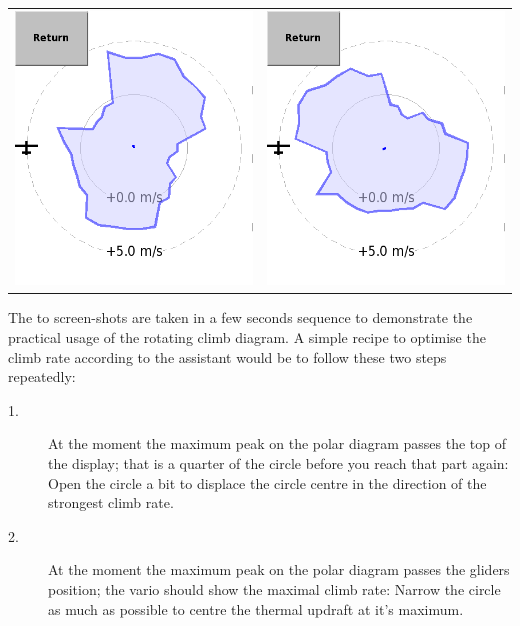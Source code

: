 \begin{tabular}{c c}
\includegraphics[angle=0,width=0.5\linewidth,keepaspectratio='true']{figures/dialog-thermal-assistant0.png}&
\includegraphics[angle=0,width=0.5\linewidth,keepaspectratio='true']{figures/dialog-thermal-assistant1.png}\\
\end{tabular}

The to screen-shots are taken in a few seconds sequence to demonstrate the
practical usage of the rotating climb diagram. A simple recipe to optimise
the climb rate according to the assistant would be to follow these two steps
repeatedly:
\begin{description}
\item[1.]  At the moment the maximum peak on the polar diagram passes the top of
the display; that is a quarter of the circle before you reach that part again:
Open the circle a bit to displace the circle centre in the direction of the
strongest climb rate.
\item[2.]  At the moment the maximum peak on the polar diagram passes the
gliders position; the vario should show the maximal climb rate: Narrow the
circle as much as possible to centre the thermal updraft at it's maximum. 
\end{description}


